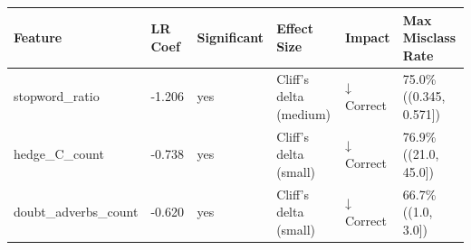 \begin{tabular}{llllll}
\toprule
Feature & LR Coef & Significant & Effect Size & Impact & Max Misclass Rate \\
\midrule
stopword\_ratio & -1.206 & yes & Cliff's delta (medium) & ↓ Correct & 75.0\% ((0.345, 0.571]) \\
hedge\_C\_count & -0.738 & yes & Cliff's delta (small) & ↓ Correct & 76.9\% ((21.0, 45.0]) \\
doubt\_adverbs\_count & -0.620 & yes & Cliff's delta (small) & ↓ Correct & 66.7\% ((1.0, 3.0]) \\
\bottomrule
\end{tabular}
